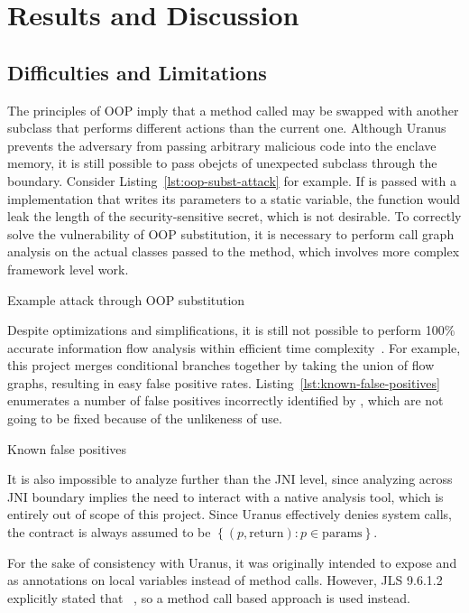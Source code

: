 \section{Results and Discussion}\label{sec:results-and-discussion}

\subsection{Difficulties and Limitations}\label{subsec:difficulties-and-limitations}
The principles of OOP imply that a method called may be swapped with another subclass
that performs different actions than the current one.
Although Uranus prevents the adversary
from passing arbitrary malicious code into the enclave memory,
it is still possible to pass obejcts of unexpected subclass
through the  boundary.
Consider Listing~\ref{lst:oop-subst-attack} for example.
If  is passed with a  implementation
that writes its parameters to a static variable,
the function would leak the length of the security-sensitive secret,
which is not desirable.
To correctly solve the vulnerability of OOP substitution,
it is necessary to perform call graph analysis on the actual classes passed to the method,
which involves more complex framework level work.

{Example attack through OOP substitution}

Despite optimizations and simplifications,
it is still not possible to perform 100\% accurate information flow analysis
within efficient time complexity~\cite{SmithGeoffrey2007PoSI}.
For example, this project merges conditional branches together
by taking the union of flow graphs,
resulting in easy false positive rates.
Listing~\ref{lst:known-false-positives} enumerates a number of false positives
incorrectly identified by \pname{},
which are not going to be fixed because of the unlikeness of use.

{Known false positives}

It is also impossible to analyze further than the JNI level,
since analyzing across JNI boundary implies
the need to interact with a native analysis tool,
which is entirely out of scope of this project.
Since Uranus effectively denies system calls,
the contract is always assumed to be
$\left\{ (p, \text{return}) : p \in \text{params} \right\}$.

For the sake of consistency with Uranus,
it was originally intended to expose  and 
as annotations on local variables instead of method calls.
However, JLS 9.6.1.2 explicitly stated that
~\cite{jls},
so a method call based approach is used instead.

